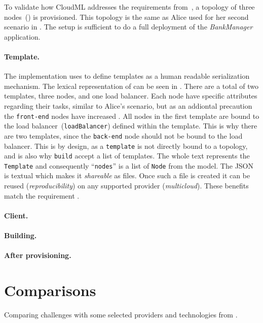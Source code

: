 
To validate how CloudML addresses the requirements from~,
a topology of three nodes~() is provisioned.
This topology is the same as Alice used for her second scenario in .
The setup is sufficient to do a full deployment of the \emph{BankManager} application.

\paragraph{Template.}


The implementation uses  to define templates as a human readable serialization mechanism.
The lexical representation of  can be seen in . 
There are a total of two templates, three nodes, and one load balancer.
Each node have specific attributes regarding their tasks, similar to Alice's scenario,
but as an addiontal precaution the \texttt{front-end} nodes have increased .
All nodes in the first template are bound to the load balancer~(\texttt{loadBalancer})
defined within the template.
This is why there are two templates, since the \texttt{back-end} node should not be bound to the load balancer.
This is by design, as a \texttt{template} is not directly bound to a topology,
and is also why \texttt{build} accept a list of templates.
The whole text represents the \texttt{Template} and consequently 
``\texttt{nodes}'' is a list of \texttt{Node} from the model.
The JSON is textual which makes it \emph{shareable} as files.
Once such a file is created it can be reused (\emph{reproducibility}) 
on any supported provider (\emph{multicloud}).
These benefits match the requirement .

\paragraph{Client.}


\paragraph{Building.}


\paragraph{After provisioning.}


\section{Comparisons}


Comparing challenges with some selected providers and technologies from .
